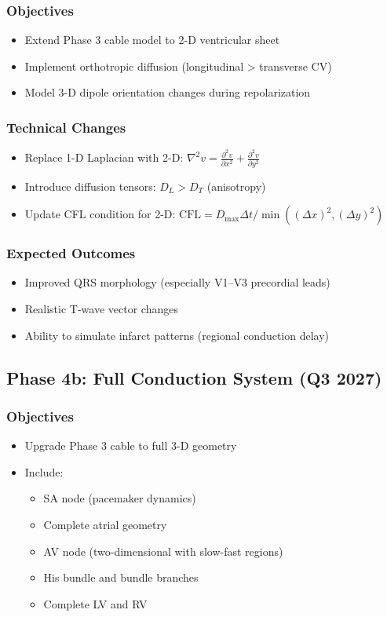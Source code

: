 \documentclass[11pt, a4paper]{article}
\begin{document}
\subsubsection{Objectives}
\begin{itemize}
    \item Extend Phase 3 cable model to 2-D ventricular sheet
    \item Implement orthotropic diffusion (longitudinal > transverse CV)
    \item Model 3-D dipole orientation changes during repolarization
\end{itemize}

\subsubsection{Technical Changes}
\begin{itemize}
    \item Replace 1-D Laplacian with 2-D: $\nabla^2 v = \frac{\partial^2 v}{\partial x^2} + \frac{\partial^2 v}{\partial y^2}$
    \item Introduce diffusion tensors: $D_L > D_T$ (anisotropy)
    \item Update CFL condition for 2-D: $\text{CFL} = D_{\max} \Delta t / \min((\Delta x)^2, (\Delta y)^2)$
\end{itemize}

\subsubsection{Expected Outcomes}
\begin{itemize}
    \item Improved QRS morphology (especially V1--V3 precordial leads)
    \item Realistic T-wave vector changes
    \item Ability to simulate infarct patterns (regional conduction delay)
\end{itemize}

\subsection{Phase 4b: Full Conduction System (Q3 2027)}

\subsubsection{Objectives}
\begin{itemize}
    \item Upgrade Phase 3 cable to full 3-D geometry
    \item Include:
    \begin{itemize}
        \item SA node (pacemaker dynamics)
        \item Complete atrial geometry
        \item AV node (two-dimensional with slow-fast regions)
        \item His bundle and bundle branches
        \item Complete LV and RV
    \end{itemize}
\end{itemize}
\end{document}
